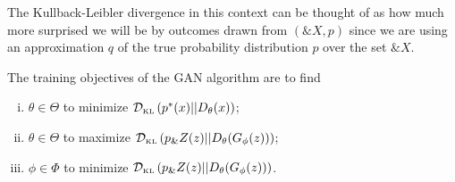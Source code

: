 \begin{remark}
The Kullback-Leibler divergence in this context can be thought of as
how much more surprised we will be by outcomes drawn from $(\&X, p)$
since we are using an approximation $q$ of the true probability
distribution $p$ over the set $\&X$.
\end{remark}

\begin{theorem}%
  \label{thm:info-objective}%
  The training objectives of the GAN algorithm are to find
  \begin{enumerate}[(i)]
  \item $\theta \in \Theta$ to minimize $\mathcal{D}_{\text{\tiny KL}}\left( p^*(x) \middle| \middle| D_\theta(x) \right)$;
  \item $\theta \in \Theta$ to maximize $\mathcal{D}_{\text{\tiny KL}}\left( p_\&Z(z) \middle| \middle| D_\theta(G_\phi(z)) \right)$;
  \item $\phi \in \Phi$ to minimize $\mathcal{D}_{\text{\tiny KL}}\left( p_\&Z(z) \middle| \middle| D_\theta(G_\phi(z)) \right)$.
  \end{enumerate}
\end{theorem}

